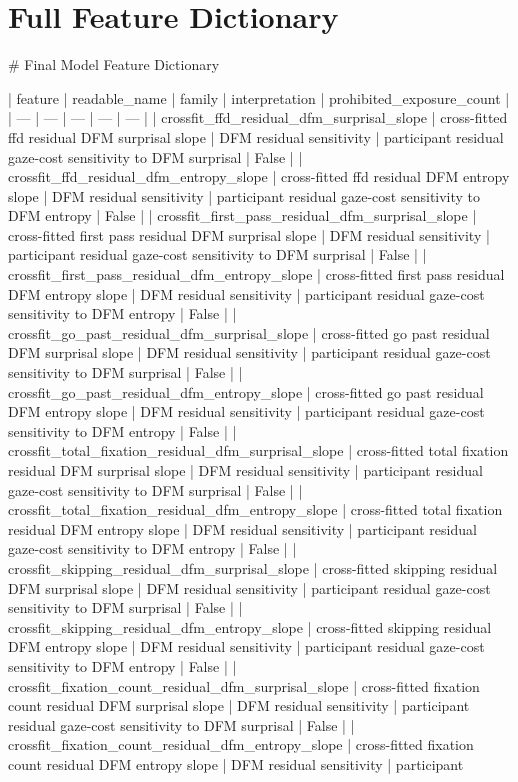 \section{Full Feature Dictionary}
\# Final Model Feature Dictionary

| feature | readable\_name | family | interpretation | prohibited\_exposure\_count |
| --- | --- | --- | --- | --- |
| crossfit\_ffd\_residual\_dfm\_surprisal\_slope | cross-fitted ffd residual DFM surprisal slope | DFM residual sensitivity | participant residual gaze-cost sensitivity to DFM surprisal | False |
| crossfit\_ffd\_residual\_dfm\_entropy\_slope | cross-fitted ffd residual DFM entropy slope | DFM residual sensitivity | participant residual gaze-cost sensitivity to DFM entropy | False |
| crossfit\_first\_pass\_residual\_dfm\_surprisal\_slope | cross-fitted first pass residual DFM surprisal slope | DFM residual sensitivity | participant residual gaze-cost sensitivity to DFM surprisal | False |
| crossfit\_first\_pass\_residual\_dfm\_entropy\_slope | cross-fitted first pass residual DFM entropy slope | DFM residual sensitivity | participant residual gaze-cost sensitivity to DFM entropy | False |
| crossfit\_go\_past\_residual\_dfm\_surprisal\_slope | cross-fitted go past residual DFM surprisal slope | DFM residual sensitivity | participant residual gaze-cost sensitivity to DFM surprisal | False |
| crossfit\_go\_past\_residual\_dfm\_entropy\_slope | cross-fitted go past residual DFM entropy slope | DFM residual sensitivity | participant residual gaze-cost sensitivity to DFM entropy | False |
| crossfit\_total\_fixation\_residual\_dfm\_surprisal\_slope | cross-fitted total fixation residual DFM surprisal slope | DFM residual sensitivity | participant residual gaze-cost sensitivity to DFM surprisal | False |
| crossfit\_total\_fixation\_residual\_dfm\_entropy\_slope | cross-fitted total fixation residual DFM entropy slope | DFM residual sensitivity | participant residual gaze-cost sensitivity to DFM entropy | False |
| crossfit\_skipping\_residual\_dfm\_surprisal\_slope | cross-fitted skipping residual DFM surprisal slope | DFM residual sensitivity | participant residual gaze-cost sensitivity to DFM surprisal | False |
| crossfit\_skipping\_residual\_dfm\_entropy\_slope | cross-fitted skipping residual DFM entropy slope | DFM residual sensitivity | participant residual gaze-cost sensitivity to DFM entropy | False |
| crossfit\_fixation\_count\_residual\_dfm\_surprisal\_slope | cross-fitted fixation count residual DFM surprisal slope | DFM residual sensitivity | participant residual gaze-cost sensitivity to DFM surprisal | False |
| crossfit\_fixation\_count\_residual\_dfm\_entropy\_slope | cross-fitted fixation count residual DFM entropy slope | DFM residual sensitivity | participant
